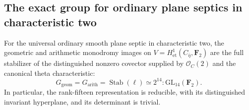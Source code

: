 \subsection{The exact group for ordinary plane septics in characteristic two}
\label{subsec:septic-exact}

\begin{theorem}\label{thm:septic-stabilizer-monodromy}
For the universal ordinary smooth plane septic in characteristic two,
the geometric and arithmetic monodromy images on
$V=H^1_{\mathrm{et}}(C_{\bar\eta},\mathbf F_2)$ are the full stabilizer
of the distinguished nonzero covector supplied by
$\mathcal O_C(2)$ and the canonical theta characteristic:
\[
 G_{\mathrm{geom}}=G_{\mathrm{arith}}
 =\operatorname{Stab}(\ell)
 \simeq 2^{14}\!:\mathrm{GL}_{14}(\mathbf F_2).
\]
In particular, the rank-fifteen representation is reducible, with its
distinguished invariant hyperplane, and its determinant is trivial.
\end{theorem}

